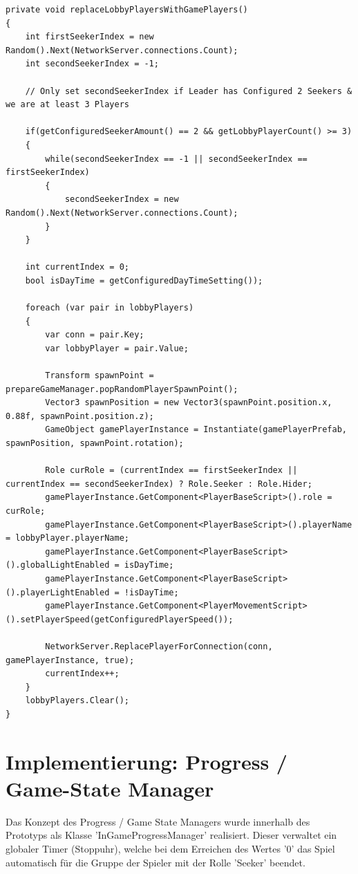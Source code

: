 \begin{lstlisting}[caption= GameNetworkManager.cs replaceLobbyPlayersWithGamePlayers()]
private void replaceLobbyPlayersWithGamePlayers()
{
	int firstSeekerIndex = new Random().Next(NetworkServer.connections.Count);
	int secondSeekerIndex = -1;
	
	// Only set secondSeekerIndex if Leader has Configured 2 Seekers & we are at least 3 Players
	
	if(getConfiguredSeekerAmount() == 2 && getLobbyPlayerCount() >= 3)
	{
		while(secondSeekerIndex == -1 || secondSeekerIndex == firstSeekerIndex)
		{
			secondSeekerIndex = new Random().Next(NetworkServer.connections.Count);
		}
	}
	
	int currentIndex = 0;
	bool isDayTime = getConfiguredDayTimeSetting());
	
	foreach (var pair in lobbyPlayers)
	{
		var conn = pair.Key;
		var lobbyPlayer = pair.Value;
		
		Transform spawnPoint = prepareGameManager.popRandomPlayerSpawnPoint();
		Vector3 spawnPosition = new Vector3(spawnPoint.position.x, 0.88f, spawnPoint.position.z);
		GameObject gamePlayerInstance = Instantiate(gamePlayerPrefab, spawnPosition, spawnPoint.rotation);
		
		Role curRole = (currentIndex == firstSeekerIndex || currentIndex == secondSeekerIndex) ? Role.Seeker : Role.Hider;
		gamePlayerInstance.GetComponent<PlayerBaseScript>().role = curRole;
		gamePlayerInstance.GetComponent<PlayerBaseScript>().playerName = lobbyPlayer.playerName;
		gamePlayerInstance.GetComponent<PlayerBaseScript>().globalLightEnabled = isDayTime;
		gamePlayerInstance.GetComponent<PlayerBaseScript>().playerLightEnabled = !isDayTime;
		gamePlayerInstance.GetComponent<PlayerMovementScript>().setPlayerSpeed(getConfiguredPlayerSpeed());
		
		NetworkServer.ReplacePlayerForConnection(conn, gamePlayerInstance, true);
		currentIndex++;
	}
	lobbyPlayers.Clear();
}
\end{lstlisting}


\section{Implementierung: Progress / Game-State Manager}
\label{Progress Manager}

Das Konzept des Progress / Game State Managers wurde innerhalb des Prototyps als Klasse 'InGameProgressManager' realisiert. Dieser verwaltet ein globaler Timer (Stoppuhr), welche bei dem Erreichen des Wertes '0' das Spiel automatisch für die Gruppe der Spieler mit der Rolle 'Seeker' beendet.

